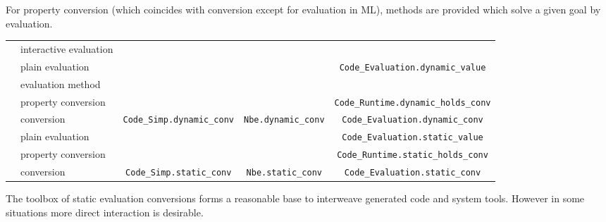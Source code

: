 \begin{isabellebody}
\begin{isamarkuptext}
  For property conversion (which coincides with conversion except for
  evaluation in ML), methods are provided which solve a given goal by
  evaluation.%
\end{isamarkuptext}%
\isamarkuptrue%
%
\isamarkuptrue%
%
\begin{isamarkuptext}%
\newcommand{\ttsize}{\fontsize{5.8pt}{8pt}\selectfont}
  \fontsize{9pt}{12pt}\selectfont
  \begin{tabular}{ll||c|c|c}
    & & \isa{simp} & \isa{nbe} & \isa{code} \tabularnewline \hline \hline
    \multirow{5}{1ex}{\rotatebox{90}{dynamic}}
      & interactive evaluation 
      & \hyperlink{command.value}{\mbox{\isa{\isacommand{value}}}} \isa{{\isaliteral{5B}{\isacharbrackleft}}simp{\isaliteral{5D}{\isacharbrackright}}} & \hyperlink{command.value}{\mbox{\isa{\isacommand{value}}}} \isa{{\isaliteral{5B}{\isacharbrackleft}}nbe{\isaliteral{5D}{\isacharbrackright}}} & \hyperlink{command.value}{\mbox{\isa{\isacommand{value}}}} \isa{{\isaliteral{5B}{\isacharbrackleft}}code{\isaliteral{5D}{\isacharbrackright}}}
      \tabularnewline
    & plain evaluation & & & \ttsize\verb|Code_Evaluation.dynamic_value| \tabularnewline \cline{2-5}
    & evaluation method & \hyperlink{method.code-simp}{\mbox{\isa{code{\isaliteral{5F}{\isacharunderscore}}simp}}} & \hyperlink{method.normalization}{\mbox{\isa{normalization}}} & \hyperlink{method.eval}{\mbox{\isa{eval}}} \tabularnewline
    & property conversion & & & \ttsize\verb|Code_Runtime.dynamic_holds_conv| \tabularnewline \cline{2-5}
    & conversion & \ttsize\verb|Code_Simp.dynamic_conv| & \ttsize\verb|Nbe.dynamic_conv|
      & \ttsize\verb|Code_Evaluation.dynamic_conv| \tabularnewline \hline \hline
    \multirow{3}{1ex}{\rotatebox{90}{static}}
    & plain evaluation & & & \ttsize\verb|Code_Evaluation.static_value| \tabularnewline \cline{2-5}
    & property conversion & &
      & \ttsize\verb|Code_Runtime.static_holds_conv| \tabularnewline \cline{2-5}
    & conversion & \ttsize\verb|Code_Simp.static_conv|
      & \ttsize\verb|Nbe.static_conv|
      & \ttsize\verb|Code_Evaluation.static_conv|
  \end{tabular}%
\end{isamarkuptext}%
\isamarkuptrue%
%
\isamarkuptrue%
%
\begin{isamarkuptext}%
The toolbox of static evaluation conversions forms a reasonable base
  to interweave generated code and system tools.  However in some
  situations more direct interaction is desirable.%

\end{isamarkuptext}
\end{isabellebody}
